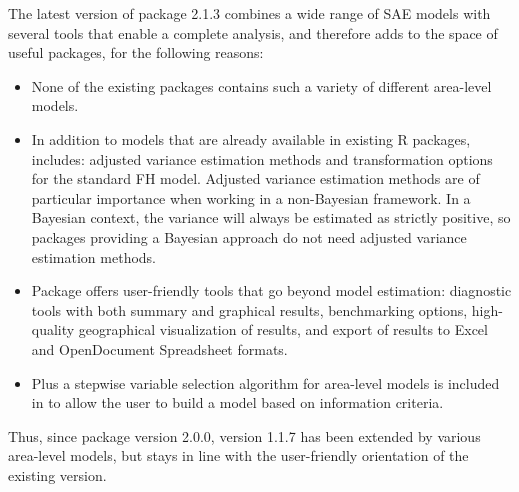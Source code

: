 The latest version of package
 2.1.3 combines a wide range of SAE models with several tools that enable a complete analysis, and therefore adds to the space of useful packages, for the following reasons:
\begin{itemize}
	\item None of the existing packages contains such a variety of different
	area-level models.
	\item In addition to models that are already available in existing R packages,  includes: adjusted variance estimation
	methods and transformation options for the standard FH model. Adjusted variance estimation methods are of particular importance when working in a non-Bayesian framework. In a Bayesian context, the variance will always be estimated as strictly positive, so packages providing a Bayesian approach do not need adjusted variance estimation methods.
	\item Package  offers user-friendly tools that go beyond model estimation: diagnostic tools with both summary and graphical results, benchmarking options, high-quality geographical visualization of results, and export of results to Excel and OpenDocument Spreadsheet formats.	
	\item Plus a stepwise variable selection algorithm for area-level models is
	included in  to allow the user to build a model based on information
	criteria.
\end{itemize}
Thus, since package version 2.0.0, version 1.1.7 has been extended by various area-level models, but stays in line with the user-friendly
orientation of the existing version.


